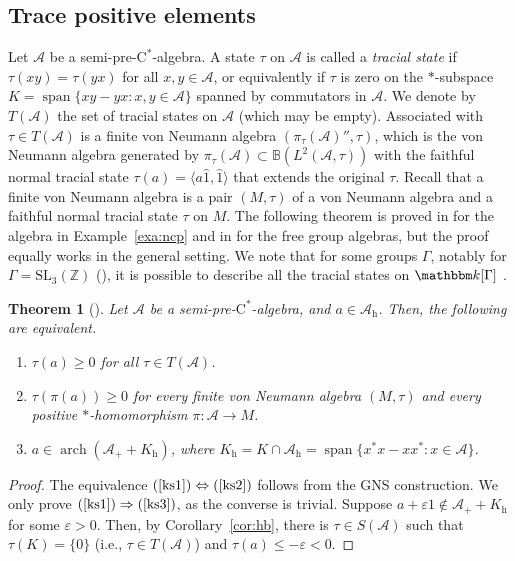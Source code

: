 \documentclass[12pt]{amsart}
\newtheorem{thm}{Theorem}
\theoremstyle{definition}
\begin{document}
\subsection{Trace positive elements}
Let ${{\mathcal A}}$ be a {semi-pre-$\mathrm{C}^*$-alge\-bra\xspace}.
A state $\tau$ on ${{\mathcal A}}$ is called a \emph{tracial state}
if $\tau(xy)=\tau(yx)$ for all $x,y\in{{\mathcal A}}$, or equivalently if
$\tau$ is zero on the $*$-subspace $K=\operatorname*{span}\{ xy-yx : x,y\in{{\mathcal A}}\}$ spanned by commutators in ${{\mathcal A}}$.
We denote by $T({{\mathcal A}})$ the set of tracial states on ${{\mathcal A}}$ (which may be empty).
Associated with $\tau\in T({{\mathcal A}})$ is a finite von Neumann algebra $(\pi_\tau({{\mathcal A}})'',\tau)$,
which is the von Neumann algebra generated by $\pi_\tau({{\mathcal A}})\subset{{\mathbb B}}(L^2({{\mathcal A}},\tau))$
with the faithful normal tracial state $\tau(a)={\mathopen{\langle}{a\hat{1},\hat{1}}\mathclose{\rangle}}$
that extends the original $\tau$.
Recall that a finite von Neumann algebra is a pair $(M,\tau)$ of
a von Neumann algebra and a faithful normal tracial state $\tau$ on $M$.
The following theorem is proved in \cite{ks} for the algebra in Example~\ref{exa:ncp}
and in \cite{jpc} for the free group algebras,
but the proof equally works in the general setting.
We note that for some groups ${\Gamma}$, notably for ${\Gamma}=\mathrm{SL}_3({{\mathbb Z}})$ (\cite{bekkas}),
it is possible to describe all the tracial states on ${{\mathbbm k}}[{\Gamma}]$ .

\begin{thm}[\cite{ks}]\label{thm:ksg}
Let ${{\mathcal A}}$ be a {semi-pre-$\mathrm{C}^*$-alge\-bra\xspace}, and $a\in{{\mathcal A}}_{\mathrm{h}}$.
Then, the following are equivalent.
\begin{enumerate}[$(1)$]
\item\label{ks1}
$\tau(a)\geq0$ for all $\tau\in T({{\mathcal A}})$.
\item\label{ks2}
$\tau(\pi(a))\geq0$ for every finite von Neumann algebra $(M,\tau)$
and every positive {$*$-homo\-mor\-phism\xspace} $\pi\colon{{\mathcal A}}\to M$.
\item\label{ks3}
$a\in\operatorname*{arch}({{\mathcal A}}_+ + K_{\mathrm{h}})$, where $K_{\mathrm{h}}=K\cap{{\mathcal A}}_{\mathrm{h}} = \operatorname*{span}\{ x^*x - xx^* : x \in {{\mathcal A}} \}$.
\end{enumerate}
\end{thm}
\begin{proof}
The equivalence $(\ref{ks1})\Leftrightarrow(\ref{ks2})$ follows from the GNS construction.
We only prove $(\ref{ks1})\Rightarrow(\ref{ks3})$, as the converse is trivial.
Suppose $a+{\varepsilon}1\notin {{\mathcal A}}_+ + K_{\mathrm{h}}$ for some ${\varepsilon}>0$.
Then, by Corollary~\ref{cor:hb}, there is $\tau\in S({{\mathcal A}})$ such that
$\tau(K)=\{0\}$ (i.e., $\tau\in T({{\mathcal A}})$) and $\tau(a)\le-{\varepsilon}<0$.
\end{proof}
\end{document}
